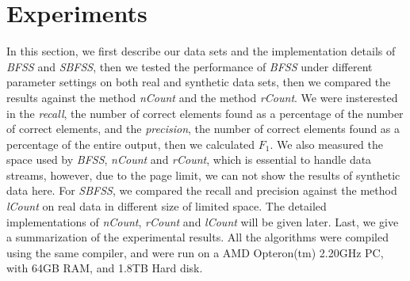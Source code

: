 \documentclass[conference]{IEEEtran}
\begin{document}
\section{Experiments}
In this section, we first describe our data sets and the implementation details of \emph{BFSS} and \emph{SBFSS}, then we tested the performance of \emph{BFSS} under different parameter settings on both real and synthetic data sets, then we compared the results against the method \emph{nCount} and the method \emph{rCount}. We were insterested in the \emph{recall}, the number of correct elements found as a percentage of the number of correct elements, and the \emph{precision}, the number of correct elements found as a percentage of the entire output, then we calculated $F_1$. We also measured the space used by \emph{BFSS}, \emph{nCount} and \emph{rCount}, which is essential to handle data streams, however, due to the page limit, we can not show the results of synthetic data here. For \emph{SBFSS}, we compared the recall and precision against the method \emph{lCount} on real data in different size of limited space. The detailed implementations of \emph{nCount}, \emph{rCount} and \emph{lCount} will be given later. Last, we give a summarization of the experimental results. All the algorithms were compiled using the same compiler, and were run on a AMD Opteron(tm) 2.20GHz PC, with 64GB RAM, and 1.8TB Hard disk.\par
\end{document}
